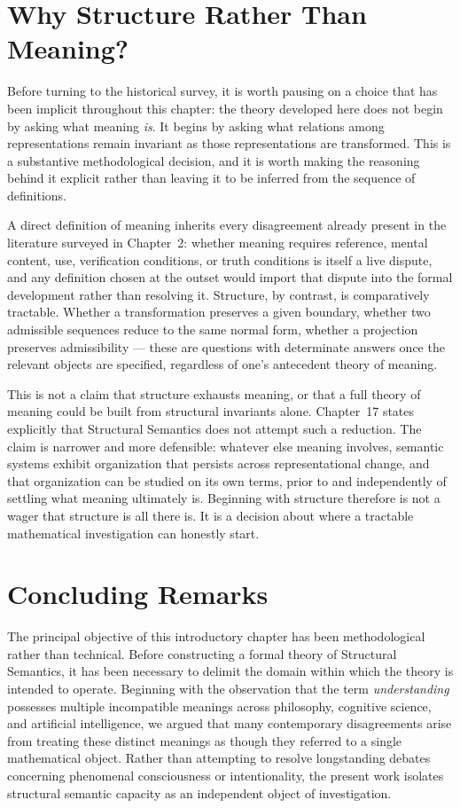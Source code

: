 \documentclass[11pt,twoside,openright]{book}
\numberwithin{equation}{chapter}
\theoremstyle{definition}
\theoremstyle{plain}
\theoremstyle{remark}
\theoremstyle{definition}
\begin{document}
\section{Why Structure Rather Than Meaning?}

Before turning to the historical survey, it is worth pausing on a choice
that has been implicit throughout this chapter: the theory developed here
does not begin by asking what meaning \emph{is}. It begins by asking what
relations among representations remain invariant as those representations
are transformed. This is a substantive methodological decision, and it is
worth making the reasoning behind it explicit rather than leaving it to
be inferred from the sequence of definitions.

A direct definition of meaning inherits every disagreement already
present in the literature surveyed in Chapter~2: whether meaning requires
reference, mental content, use, verification conditions, or truth
conditions is itself a live dispute, and any definition chosen at the
outset would import that dispute into the formal development rather than
resolving it. Structure, by contrast, is comparatively tractable. Whether
a transformation preserves a given boundary, whether two admissible
sequences reduce to the same normal form, whether a projection preserves
admissibility --- these are questions with determinate answers once the
relevant objects are specified, regardless of one's antecedent theory of
meaning.

This is not a claim that structure exhausts meaning, or that a full
theory of meaning could be built from structural invariants alone.
Chapter~17 states explicitly that Structural Semantics does not attempt
such a reduction. The claim is narrower and more defensible: whatever
else meaning involves, semantic systems exhibit organization that persists
across representational change, and that organization can be studied on
its own terms, prior to and independently of settling what meaning
ultimately is. Beginning with structure therefore is not a wager that
structure is all there is. It is a decision about where a tractable
mathematical investigation can honestly start.

\section{Concluding Remarks}

The principal objective of this introductory chapter has been
methodological rather than technical. Before constructing a formal theory
of Structural Semantics, it has been necessary to delimit the domain
within which the theory is intended to operate. Beginning with the
observation that the term \emph{understanding} possesses multiple
incompatible meanings across philosophy, cognitive science, and
artificial intelligence, we argued that many contemporary disagreements
arise from treating these distinct meanings as though they referred to a
single mathematical object. Rather than attempting to resolve
longstanding debates concerning phenomenal consciousness or
intentionality, the present work isolates structural semantic capacity as
an independent object of investigation.
\end{document}
